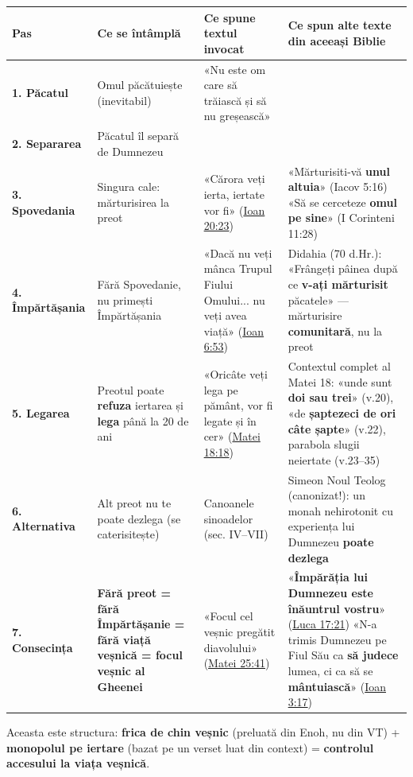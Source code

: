 \documentclass[12pt,a4paper,twoside,openany]{book}
\begin{document}
\begin{center}
\small
\begin{tabular}{L{0.8cm}L{3.6cm}L{3.5cm}L{6.7cm}}
\toprule
{}
\textbf{Pas} & \textbf{Ce se întâmplă} & \textbf{Ce spune textul invocat} & \textbf{Ce spun alte texte din aceeași Biblie} \\
\midrule
\textbf{1. Păcatul} & Omul păcătuiește (inevitabil) & «Nu este om care să trăiască și să nu greșească» &  \\
\textbf{2. Separarea} & Păcatul îl separă de Dumnezeu &  &  \\
\textbf{3. Spovedania} & Singura cale: mărturisirea la preot & «Cărora veți ierta, iertate vor fi» (\href{https://bibliaortodoxa.ro/carte.php?id=35\&cap=20\#23}{Ioan 20:23}) & «Mărturisiti-vă \textbf{unul altuia}» (Iacov 5:16) \newline  «Să se cerceteze \textbf{omul pe sine}» (I Corinteni 11:28) \\
\textbf{4. Împărtășania} & Fără Spovedanie, nu primești Împărtășania & «Dacă nu veți mânca Trupul Fiului Omului... nu veți avea viață» (\href{https://bibliaortodoxa.ro/carte.php?id=35\&cap=6\#53}{Ioan 6:53}) & Didahia (70 d.Hr.): «Frângeți pâinea după ce \textbf{v-ați mărturisit} păcatele» — mărturisire \textbf{comunitară}, nu la preot \\
\textbf{5. Legarea} & Preotul poate \textbf{refuza} iertarea și \textbf{lega} până la 20 de ani & «Oricâte veți lega pe pământ, vor fi legate și în cer» (\href{https://bibliaortodoxa.ro/carte.php?id=55\&cap=18\#18}{Matei 18:18}) & Contextul complet al Matei 18: «unde sunt \textbf{doi sau trei}» (v.20), «de \textbf{șaptezeci de ori câte șapte}» (v.22), parabola slugii neiertate (v.23–35) \\
\textbf{6. Alternativa} & Alt preot nu te poate dezlega (se caterisitește) & Canoanele sinoadelor (sec. IV–VII) & Simeon Noul Teolog (canonizat!): un monah nehirotonit cu experiența lui Dumnezeu \textbf{poate dezlega} \\
\textbf{7. Consecința} & \textbf{Fără preot = fără Împărtășanie = fără viață veșnică = focul veșnic al Gheenei} & «Focul cel veșnic pregătit diavolului» (\href{https://bibliaortodoxa.ro/carte.php?id=55\&cap=25\#41}{Matei 25:41}) & «\textbf{Împărăția lui Dumnezeu este înăuntrul vostru}» (\href{https://bibliaortodoxa.ro/carte.php?id=48\&cap=17\#21}{Luca 17:21}) \newline  «N-a trimis Dumnezeu pe Fiul Său ca \textbf{să judece} lumea, ci ca să se \textbf{mântuiască}» (\href{https://bibliaortodoxa.ro/carte.php?id=35\&cap=3\#17}{Ioan 3:17}) \\
\bottomrule
\end{tabular}
\end{center}
\normalsize
Aceasta este structura: \textbf{frica de chin veșnic} (preluată din Enoh, nu din VT) + \textbf{monopolul pe iertare} (bazat pe un verset luat din context) = \textbf{controlul accesului la viața veșnică}.
\end{document}
